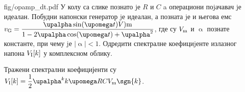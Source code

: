 \begin{slikaDesno}[.833]{fig/opamp_dt.pdf}
    \PID 
    У колу са слике познато jе $R$ и $C$ a операциони поjачавач jе идеалан. 
    Побудни напонски генератор jе идеалан, а позната jе и његова
    емс 
    $v_{\rm G} = \dfrac{\upalpha \sin(\upomega t) V){\rm m} }{1 - 2\upalpha \cos(\upomega t) + \upalpha^2}$, 
    где су $V_{\rm m}$ и $\upalpha$ познате константе, при
    чему jе $|\upalpha| < 1$. Одредити спектралне коефициjенте излазног напона 
    $V_{\rm I} [k]$ у комплексном облику.
\end{slikaDesno}

\REZULTAT 
Тражени спектрални коефицијенти су 
$V_{\rm I}[k] = \dfrac{1}{2} \upalpha^k k\upomega R C V_{\rm m} \sgn{k}$.